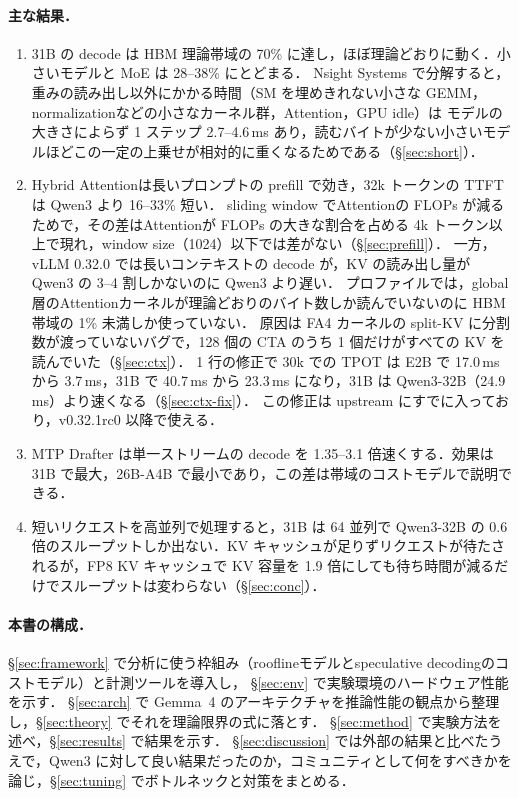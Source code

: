 \documentclass[a4paper,10pt]{ltjsarticle}
\begin{document}
\paragraph{主な結果．}
\begin{enumerate}
\item 31B の decode は HBM 理論帯域の 70\% に達し，ほぼ理論どおりに動く．小さいモデルと MoE は 28--38\% にとどまる．
      Nsight Systems で分解すると，重みの読み出し以外にかかる時間（SM を埋めきれない小さな GEMM，normalizationなどの小さなカーネル群，Attention，GPU idle）は
      モデルの大きさによらず 1 ステップ 2.7--4.6\,ms あり，読むバイトが少ない小さいモデルほどこの一定の上乗せが相対的に重くなるためである（\S\ref{sec:short}）．
\item Hybrid Attentionは長いプロンプトの prefill で効き，32k トークンの TTFT は Qwen3 より 16--33\% 短い．
      sliding window でAttentionの FLOPs が減るためで，その差はAttentionが FLOPs の大きな割合を占める 4k トークン以上で現れ，window size（1024）以下では差がない（\S\ref{sec:prefill}）．
      一方，vLLM 0.32.0 では長いコンテキストの decode が，KV の読み出し量が Qwen3 の 3--4 割しかないのに Qwen3 より遅い．
      プロファイルでは，global 層のAttentionカーネルが理論どおりのバイト数しか読んでいないのに HBM 帯域の 1\% 未満しか使っていない．
      原因は FA4 カーネルの split-KV に分割数が渡っていないバグで，128 個の CTA のうち 1 個だけがすべての KV を読んでいた（\S\ref{sec:ctx}）．
      1 行の修正で 30k での TPOT は E2B で 17.0\,ms から 3.7\,ms，31B で 40.7\,ms から 23.3\,ms になり，31B は Qwen3-32B（24.9\,ms）より速くなる（\S\ref{sec:ctx-fix}）．
      この修正は upstream にすでに入っており，v0.32.1rc0 以降で使える．
\item MTP Drafter は単一ストリームの decode を 1.35--3.1 倍速くする．効果は 31B で最大，26B-A4B で最小であり，この差は帯域のコストモデルで説明できる．
\item 短いリクエストを高並列で処理すると，31B は 64 並列で Qwen3-32B の 0.6 倍のスループットしか出ない．KV キャッシュが足りずリクエストが待たされるが，FP8 KV キャッシュで KV 容量を 1.9 倍にしても待ち時間が減るだけでスループットは変わらない（\S\ref{sec:conc}）．
\end{enumerate}

\paragraph{本書の構成．}
\S\ref{sec:framework} で分析に使う枠組み（rooflineモデルとspeculative decodingのコストモデル）と計測ツールを導入し，
\S\ref{sec:env} で実験環境のハードウェア性能を示す．
\S\ref{sec:arch} で Gemma~4 のアーキテクチャを推論性能の観点から整理し，\S\ref{sec:theory} でそれを理論限界の式に落とす．
\S\ref{sec:method} で実験方法を述べ，\S\ref{sec:results} で結果を示す．
\S\ref{sec:discussion} では外部の結果と比べたうえで，Qwen3 に対して良い結果だったのか，コミュニティとして何をすべきかを論じ，\S\ref{sec:tuning} でボトルネックと対策をまとめる．
\end{document}
